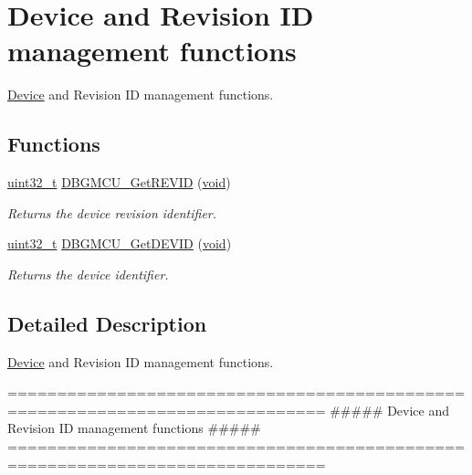 \hypertarget{group___d_b_g_m_c_u___group1}{\section{Device and Revision I\-D management functions}
\label{group___d_b_g_m_c_u___group1}
}


\hyperlink{struct_device}{Device} and Revision I\-D management functions.  


\subsection*{Functions}
\begin{DoxyCompactItemize}
\item 
\hyperlink{stdint_8h_a435d1572bf3f880d55459d9805097f62}{uint32\-\_\-t} \hyperlink{group___d_b_g_m_c_u___group1_ga47419e9ca75ab7be4c70feb82faa0511}{D\-B\-G\-M\-C\-U\-\_\-\-Get\-R\-E\-V\-I\-D} (\hyperlink{group___n_a_m_e_ga18028b8badbf1ea7e704ccac3c488e82}{void})
\begin{DoxyCompactList}\small\item\em Returns the device revision identifier. \end{DoxyCompactList}\item 
\hyperlink{stdint_8h_a435d1572bf3f880d55459d9805097f62}{uint32\-\_\-t} \hyperlink{group___d_b_g_m_c_u___group1_gac34193c34dbce759bf424957a31b3266}{D\-B\-G\-M\-C\-U\-\_\-\-Get\-D\-E\-V\-I\-D} (\hyperlink{group___n_a_m_e_ga18028b8badbf1ea7e704ccac3c488e82}{void})
\begin{DoxyCompactList}\small\item\em Returns the device identifier. \end{DoxyCompactList}\end{DoxyCompactItemize}


\subsection{Detailed Description}
\hyperlink{struct_device}{Device} and Revision I\-D management functions. \begin{DoxyVerb}  ==============================================================================
            ##### Device and Revision ID management functions #####
  ==============================================================================\end{DoxyVerb}
 

